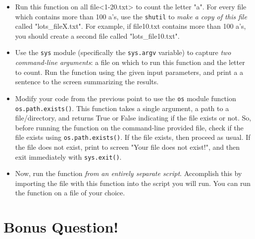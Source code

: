 \documentclass{article}[12pt]
\newcommand{\code}[1]{\texttt{#1}}  %
\begin{document}
\begin{enumerate}
	\begin{itemize}
		\item Run this function on all file<1-20.txt> to count the letter "a". For every file which contains more than 100 a's, use the \code{shutil} to \emph{make a copy of this file} called "lots\_fileX.txt". For example, if file10.txt contains more than 100 a's, you should create a second file called "lots\_file10.txt". 
		\item Use the \code{sys} module (specifically the \code{sys.argv} variable) to capture \emph{two command-line arguments}: a file on which to run this function and the letter to count. Run the function using the given input parameters, and print a a sentence to the screen summarizing the results.
		\item Modify your code from the previous point to use the \code{os} module function \code{os.path.exists()}. This function takes a single argument, a path to a file/directory, and returns True or False indicating if the file exists or not. So, before running the function on the command-line provided file, check if the file exists using \code{os.path.exists()}. If the file exists, then proceed as usual. If the file does not exist, print to screen "Your file does not exist!", and then exit immediately with \code{sys.exit()}.
		\item Now, run the function \emph{from an entirely separate script}. Accomplish this by importing the file with this function into the script you will run. You can run the function on a file of your choice.
	\end{itemize}


\end{enumerate}


\section*{Bonus Question!}	
	
\end{document}

